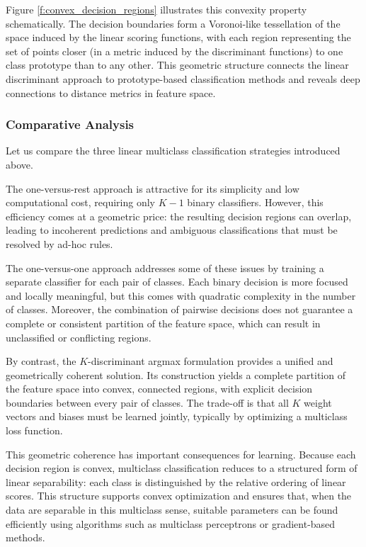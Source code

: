 Figure \ref{f:convex_decision_regions} illustrates this convexity property schematically. The decision boundaries form a Voronoi-like tessellation of the space induced by the linear scoring functions, with each region representing the set of points closer (in a metric induced by the discriminant functions) to one class prototype than to any other. This geometric structure connects the linear discriminant approach to prototype-based classification methods and reveals deep connections to distance metrics in feature space.

\subsubsection*{Comparative Analysis}

Let us compare the three linear multiclass classification strategies introduced above.

The \alert{one-versus-rest} approach is attractive for its simplicity and low computational cost, requiring only $K-1$ binary classifiers. However, this efficiency comes at a geometric price: the resulting decision regions can overlap, leading to incoherent predictions and ambiguous classifications that must be resolved by ad-hoc rules.

The \alert{one-versus-one} approach addresses some of these issues by training a separate classifier for each pair of classes. Each binary decision is more focused and locally meaningful, but this comes with quadratic complexity in the number of classes. Moreover, the combination of pairwise decisions does not guarantee a complete or consistent partition of the feature space, which can result in unclassified or conflicting regions.

By contrast, the \alert{$K$-discriminant argmax formulation} provides a unified and geometrically coherent solution. Its construction yields a complete partition of the feature space into convex, connected regions, with explicit decision boundaries between every pair of classes. The trade-off is that all $K$ weight vectors and biases must be learned jointly, typically by optimizing a multiclass loss function.

This geometric coherence has important consequences for learning. Because each decision region is convex, multiclass classification reduces to a structured form of linear separability: each class is distinguished by the relative ordering of linear scores. This structure supports convex optimization and ensures that, when the data are separable in this multiclass sense, suitable parameters can be found efficiently using algorithms such as multiclass perceptrons or gradient-based methods.


